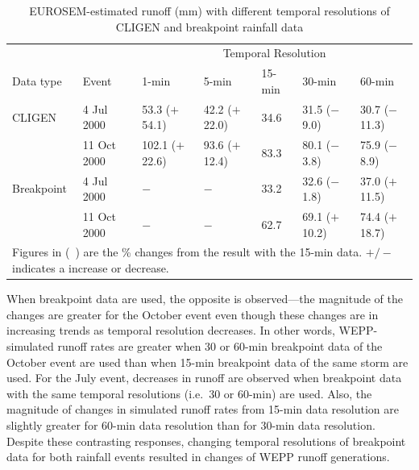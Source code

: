 \begin{table}[htbp]
  \centering
  \footnotesize
  \caption[EUROSEM-estimated runoff (mm) with different temporal resolutions of
CLIGEN and breakpoint rainfall data]{EUROSEM-estimated runoff (mm) with
different temporal resolutions of CLIGEN and breakpoint rainfall data}
\label{tab:DifferentTemporalScalesOfRainfallDataOnEUROSEMRunoffEstimation}
    \begin{tabular}{lllllll}
      \toprule
      & & \multicolumn{5}{c}{Temporal Resolution}\\
      \cmidrule{3-7}
      Data type & Event & 1-min & 5-min & 15-min & 30-min & 60-min \\
      \midrule
      CLIGEN & 4 Jul 2000 & 53.3 ($+$54.1) & 42.2 ($+$22.0) & 34.6 & 31.5
($-$9.0) & 30.7 ($-$11.3) \\
       & 11 Oct 2000 & 102.1 ($+$22.6) & 93.6 ($+$12.4) & 83.3 & 80.1 ($-$3.8) &
75.9 ($-$8.9) \\
       \midrule
      Breakpoint & 4 Jul 2000 & $-$ & $-$ & 33.2 & 32.6 ($-$1.8) & 37.0
($+$11.5) \\
       & 11 Oct 2000 & $-$ & $-$ & 62.7 & 69.1 ($+$10.2) & 74.4 ($+$18.7)\\
      \bottomrule
      \multicolumn{7}{p{12cm}}{\footnotesize Figures in (\ ) are the \% changes
from the result with the 15-min data. $+/-$ indicates a increase or decrease.}\\
    \end{tabular}
\end{table}

When breakpoint data are used, the opposite is observed---the magnitude of the
changes are greater for the October event even though these changes are in
increasing trends as temporal resolution decreases. In other words,
WEPP-simulated runoff rates are greater when 30 or 60-min breakpoint data of the
October event are used than when 15-min breakpoint data of the same storm are
used. For the July event, decreases in runoff are observed when breakpoint data
with the same temporal resolutions (i.e.\ 30 or 60-min) are used. Also, the
magnitude of changes in simulated runoff rates from 15-min data resolution are
slightly greater for 60-min data resolution than for 30-min data resolution.
Despite these contrasting responses, changing temporal resolutions of breakpoint
data for both rainfall events resulted in changes of WEPP runoff generations.


